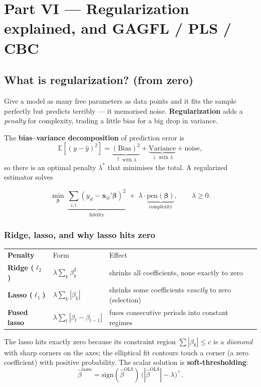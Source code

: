 \documentclass[11pt,a4paper]{article}
\newcommand{\E}{\mathbb{E}}
\newcommand{\hlt}[2]{\textcolor{#1}{\textbf{#2}}}
\newcommand{\bbeta}{\boldsymbol{\beta}}
\newcommand{\bx}{\mathbf{x}}
\theoremstyle{definition}
\begin{document}
\section{Part VI --- Regularization explained, and GAGFL / PLS / CBC}

\subsection{What is regularization? (from zero)}
\begin{begbox}
Give a model as many free parameters as data points and it fits the sample perfectly but predicts
terribly --- it memorised noise. \hlt{cteal}{Regularization} adds a \emph{penalty} for complexity,
trading a little bias for a big drop in variance.
\end{begbox}
The \hlt{cblue}{bias--variance decomposition} of prediction error is
\begin{equation}
\E[(y-\hat y)^2]=\underbrace{(\text{Bias})^2}_{\uparrow\text{ with }\lambda}
+\underbrace{\text{Variance}}_{\downarrow\text{ with }\lambda}+\text{noise},
\end{equation}
so there is an optimal penalty $\lambda^\ast$ that minimises the total. A regularized estimator solves
\begin{eqbox}
\[
\min_{\bbeta}\ \underbrace{\sum_{i,t}(y_{it}-\bx_{it}'\bbeta)^2}_{\text{fidelity}}
\;+\;\lambda\cdot\underbrace{\mathrm{pen}(\bbeta)}_{\text{complexity}} ,\qquad \lambda\ge 0.
\]
\end{eqbox}

\subsubsection{Ridge, lasso, and why lasso hits zero}
\begin{center}
\begin{tabular}{@{}>{\bfseries}l l p{7.8cm}@{}}
\rowcolor{cteal}\color{white}Penalty & \color{white}Form & \color{white}Effect\\
Ridge ($\ell_2$) & $\lambda\sum_k\beta_k^2$ & shrinks all coefficients, none exactly to zero\\
Lasso ($\ell_1$) & $\lambda\sum_k|\beta_k|$ & shrinks some coefficients \emph{exactly} to zero (selection)\\
Fused lasso & $\lambda\sum_t|\beta_t-\beta_{t-1}|$ & fuses consecutive periods into constant regimes\\
\end{tabular}
\end{center}
The lasso hits exactly zero because its constraint region $\sum|\beta_k|\le c$ is a
\emph{diamond} with sharp corners on the axes; the elliptical fit contours touch a corner (a zero
coefficient) with positive probability. The scalar solution is \hlt{camber}{soft-thresholding}:
\begin{equation}
\hat\beta^{\text{lasso}}=\mathrm{sign}(\hat\beta^{\text{OLS}})\,\big(|\hat\beta^{\text{OLS}}|-\lambda\big)^+ .
\end{equation}
\end{document}
